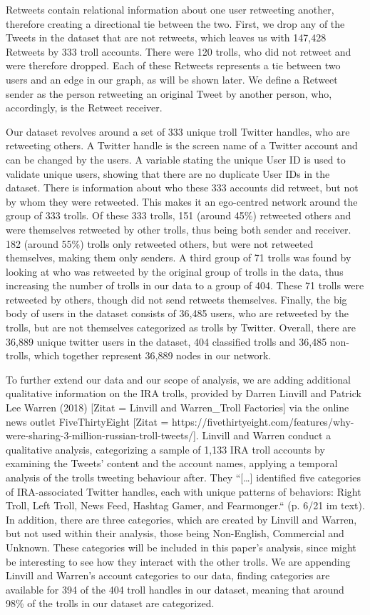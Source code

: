 \documentclass[12pt, titlepage=true, toc=bib]{scrartcl}
\begin{document}
Retweets contain relational information about one user retweeting another, therefore creating a directional tie between the two. First, we drop any of the Tweets in the dataset that are not retweets, which leaves us with 147,428 Retweets by 333 troll accounts. There were 120 trolls, who did not retweet and were therefore dropped. Each of these Retweets represents a tie between two users and an edge in our graph, as will be shown later. We define a Retweet sender as the person retweeting an original Tweet by another person, who, accordingly, is the Retweet receiver.
 
Our dataset revolves around a set of 333 unique troll Twitter handles, who are retweeting others. A Twitter handle is the screen name of a Twitter account and can be changed by the users. A variable stating the unique User ID is used to validate unique users, showing that there are no duplicate User IDs in the dataset. There is information about who these 333 accounts did retweet, but not by whom they were retweeted. This makes it an ego-centred network around the group of 333 trolls. Of these 333 trolls, 151 (around 45\%) retweeted others and were themselves retweeted by other trolls, thus being both sender and receiver. 182 (around 55\%) trolls only retweeted others, but were not retweeted themselves, making them only senders. A third group of 71 trolls was found by looking at who was retweeted by the original group of trolls in the data, thus increasing the number of trolls in our data to a group of 404. These 71 trolls were retweeted by others, though did not send retweets themselves. Finally, the big body of users in the dataset consists of 36,485 users, who are retweeted by the trolls, but are not themselves categorized as trolls by Twitter. Overall, there are 36,889 unique twitter users in the dataset, 404 classified trolls and 36,485 non-trolls, which together represent 36,889 nodes in our network.

To further extend our data and our scope of analysis, we are adding additional qualitative information on the IRA trolls, provided by Darren Linvill and Patrick Lee Warren (2018) [Zitat = Linvill and Warren_Troll Factories] via the online news outlet FiveThirtyEight [Zitat = https://fivethirtyeight.com/features/why-were-sharing-3-million-russian-troll-tweets/]. Linvill and Warren conduct a qualitative analysis, categorizing a sample of 1,133 IRA troll accounts by examining the Tweets’ content and the account names, applying a temporal analysis of the trolls tweeting behaviour after. They “[…] identified five categories of IRA-associated Twitter handles, each with unique patterns of behaviors: Right Troll, Left Troll, News Feed, Hashtag Gamer, and Fearmonger.“ (p. 6/21 im text). In addition, there are three categories, which are created by Linvill and Warren, but not used within their analysis, those being Non-English, Commercial and Unknown. These categories will be included in this paper’s analysis, since might be interesting to see how they interact with the other trolls. We are appending Linvill and Warren’s account categories to our data, finding categories are available for 394 of the 404 troll handles in our dataset, meaning that around 98\% of the trolls in our dataset are categorized.
 
\end{document}
